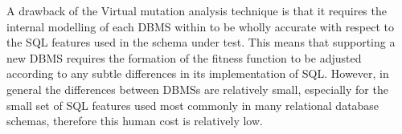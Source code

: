 {	A drawback of the Virtual mutation analysis technique is that it requires the internal modelling of each DBMS within \SA to be wholly accurate with respect to the SQL features used in the schema under test. This means that supporting a new DBMS requires the formation of the fitness function to be adjusted according to any subtle differences in its implementation of SQL. However, in general the differences between DBMSs are relatively small, especially for the small set of SQL features used most commonly in many relational database schemas, therefore this human cost is relatively low.
	}
